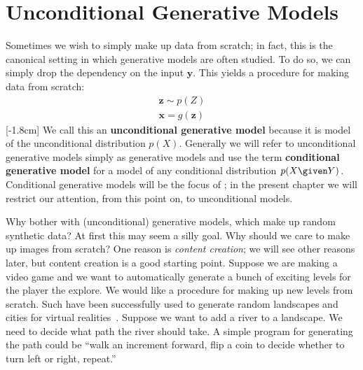\section{Unconditional Generative Models}
Sometimes we wish to simply make up data from scratch; in fact, this is the canonical setting in which generative models are often studied. To do so, we can simply drop the dependency on the input $\mathbf{y}$. This yields a procedure for making data from scratch:
\begin{align}
    \mathbf{z} \sim p(Z)\\
    \mathbf{x} = g(\mathbf{z})
\end{align}
[-1.8cm]
We call this an \textbf{unconditional generative model} because it is model of the unconditional distribution $p(X)$. Generally we will refer to unconditional generative models simply as generative models and use the term \textbf{conditional generative model} for a model of any conditional distribution $p(X \given Y)$. Conditional generative models will be the focus of \chap{\ref{chapter:conditional_generative_models}}; in the present chapter we will restrict our attention, from this point on, to unconditional models.

Why bother with (unconditional) generative models, which make up random synthetic data? At first this may seem a silly goal. Why should we care to make up images from scratch? One reason is \emph{content creation}; we will see other reasons later, but content creation is a good starting point. Suppose we are making a video game and we want to automatically generate a bunch of exciting levels for the player the explore. We would like a procedure for making up new levels from scratch. Such  have been successfully used to generate random landscapes and cities for virtual realities~\cite{parish2001procedural}. Suppose we want to add a river to a landscape. We need to decide what path the river should take. A simple program for generating the path could be ``walk an increment forward, flip a coin to decide whether to turn left or right, repeat.'' 


